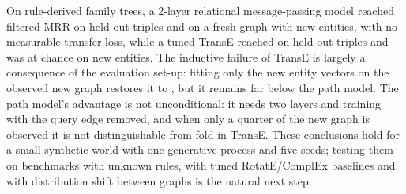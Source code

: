 On rule-derived family trees, a 2-layer relational message-passing model reached filtered MRR  on held-out triples and  on a fresh graph with new entities, with no measurable transfer loss, while a tuned TransE reached  on held-out triples and was at chance on new entities. The inductive failure of TransE is largely a consequence of the evaluation set-up: fitting only the new entity vectors on the observed new graph restores it to , but it remains far below the path model. The path model's advantage is not unconditional: it needs two layers and training with the query edge removed, and when only a quarter of the new graph is observed it is not distinguishable from fold-in TransE. These conclusions hold for a small synthetic world with one generative process and five seeds; testing them on benchmarks with unknown rules, with tuned RotatE/ComplEx baselines and with distribution shift between graphs is the natural next step.

